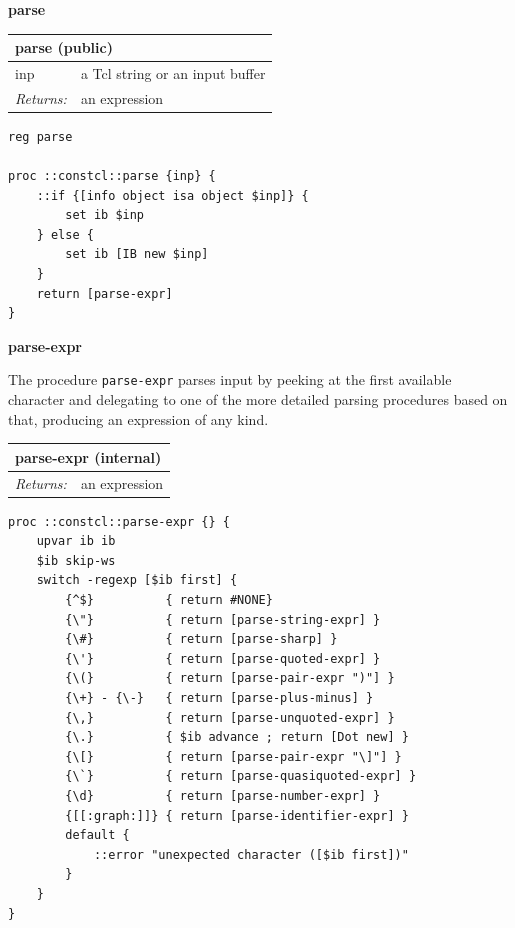 \documentclass[twoside,9pt]{report}
\begin{document}
\textbf{parse}

\begin{tabular}{ |l l| }
\hline
\multicolumn{2}{|l|}{parse (public)} \\
\hline
inp & a Tcl string or an input buffer \\
\textit{Returns:} & an expression \\
\hline
\end{tabular}

\noindent\makebox[\linewidth]{\rule{\linewidth}{0.4pt}}
\begin{lstlisting}
reg parse
 
proc ::constcl::parse {inp} {
    ::if {[info object isa object $inp]} {
        set ib $inp
    } else {
        set ib [IB new $inp]
    }
    return [parse-expr]
}
\end{lstlisting}
\noindent\makebox[\linewidth]{\rule{\linewidth}{0.4pt}}

\textbf{parse-expr}


The procedure \texttt{parse-expr} parses input by peeking at the first available character and delegating to one of the more detailed parsing procedures based on that, producing an expression of any kind.

\begin{tabular}{ |l l| }
\hline
\multicolumn{2}{|l|}{parse-expr (internal)} \\
\hline
\textit{Returns:} & an expression \\
\hline
\end{tabular}

\noindent\makebox[\linewidth]{\rule{\linewidth}{0.4pt}}
\begin{lstlisting}
proc ::constcl::parse-expr {} {
    upvar ib ib
    $ib skip-ws
    switch -regexp [$ib first] {
        {^$}          { return #NONE}
        {\"}          { return [parse-string-expr] }
        {\#}          { return [parse-sharp] }
        {\'}          { return [parse-quoted-expr] }
        {\(}          { return [parse-pair-expr ")"] }
        {\+} - {\-}   { return [parse-plus-minus] }
        {\,}          { return [parse-unquoted-expr] }
        {\.}          { $ib advance ; return [Dot new] }
        {\[}          { return [parse-pair-expr "\]"] }
        {\`}          { return [parse-quasiquoted-expr] }
        {\d}          { return [parse-number-expr] }
        {[[:graph:]]} { return [parse-identifier-expr] }
        default {
            ::error "unexpected character ([$ib first])"
        }
    }
}
\end{lstlisting}
\noindent\makebox[\linewidth]{\rule{\linewidth}{0.4pt}}
\end{document}

